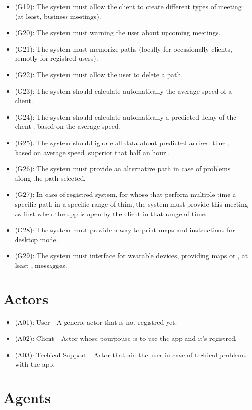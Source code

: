 \documentclass[a4paper]{book}
\begin{document}
\begin{itemize}
\item (G19): The system must allow the client to create different types of meeting (at least, business meetings).
\item (G20): The system must warning the user about upcoming meetings.
\item (G21): The system must memorize paths (locally for occasionally clients, remotly for registred users).
\item (G22): The system must allow the user to delete a path.
\item (G23): The system should calculate automatically the average speed of a client.
\item (G24): The system should calculate automatically a predicted delay of the client , based on the average speed.
\item (G25): The system should ignore all data about predicted arrived time , based on average speed, superior that half an hour .
\item (G26): The system must provide an alternative path in case of problems along the path selected.
\item (G27): In case of registred system, for whose that perform multiple time a specific path in a specific range of thim, the system must provide this meeting as first when the app is open by the client in that range of time.
\item (G28): The system must provide a way to print maps and instructions for desktop mode.
\item (G29): The system must interface for wearable devices, providing maps or , at least , messagges.

\end{itemize}

\section{Actors}
\begin{itemize}

\item (A01): User - A generic actor that is not registred yet.
\item (A02): Client - Actor whose pourpouse is to use the app and it's registred.
\item (A03): Techical Support - Actor that aid the user in case of techical problems with the app.

\end{itemize}

\section{Agents}
\end{document}
